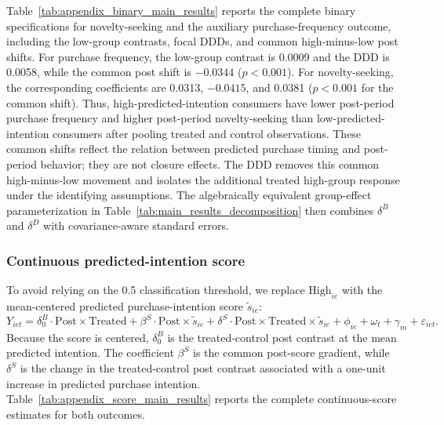 \documentclass[11 pt]{article}
\begin{document}
Table~\ref{tab:appendix_binary_main_results} reports the complete binary specifications for novelty-seeking and the auxiliary purchase-frequency outcome, including the low-group contrasts, focal DDDs, and common high-minus-low post shifts. For purchase frequency, the low-group contrast is 0.0009 and the DDD is 0.0058, while the common post shift is $-0.0344$ ($p<0.001$). For novelty-seeking, the corresponding coefficients are 0.0313, $-0.0415$, and 0.0381 ($p<0.001$ for the common shift). Thus, high-predicted-intention consumers have lower post-period purchase frequency and higher post-period novelty-seeking than low-predicted-intention consumers after pooling treated and control observations. These common shifts reflect the relation between predicted purchase timing and post-period behavior; they are not closure effects. The DDD removes this common high-minus-low movement and isolates the additional treated high-group response under the identifying assumptions. The algebraically equivalent group-effect parameterization in Table~\ref{tab:main_results_decomposition} then combines $\delta^B$ and $\delta^D$ with covariance-aware standard errors.

\subsubsection{Continuous predicted-intention score}

To avoid relying on the 0.5 classification threshold, we replace $\text{High}_{ie}$ with the mean-centered predicted purchase-intention score $\widetilde{s}_{ie}$:
\begin{equation}
	Y_{iet} = \delta_0^B \cdot \text{Post} \times \text{Treated}
	+ \beta^S \cdot \text{Post} \times \widetilde{s}_{ie}
	+ \delta^S \cdot \text{Post} \times \text{Treated} \times \widetilde{s}_{ie}
	+ \phi_{ie} + \omega_t + \gamma_m + \varepsilon_{iet}.
	\label{eq:score_ddd}
\end{equation}
Because the score is centered, $\delta_0^B$ is the treated-control post contrast at the mean predicted intention. The coefficient $\beta^S$ is the common post-score gradient, while $\delta^S$ is the change in the treated-control post contrast associated with a one-unit increase in predicted purchase intention. Table~\ref{tab:appendix_score_main_results} reports the complete continuous-score estimates for both outcomes.
\end{document}

